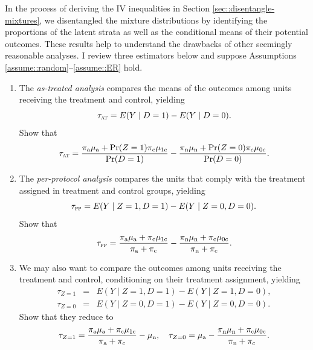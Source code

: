 \begin{HomeworkProblem}\label{exr:22-8}

In the process of deriving the IV inequalities in Section \ref{sec::disentangle-mixtures}, we disentangled the mixture distributions by identifying the proportions of the latent strata as well as the conditional means of their potential outcomes. These results help to understand the drawbacks of other seemingly reasonable analyses. I review three estimators below and suppose Assumptions \ref{assume::random}--\ref{assume::ER} hold.


\begin{enumerate}
\item
The {\it as-treated analysis} compares the means of the outcomes among units receiving the treatment and control, yielding
\[
\tau_\textsc{at} = E(Y\mid D=1) - E(Y\mid D=0).
\]
Show that
\[
\tau_\textsc{at} = \frac{  \pi_{\textup{a}} \mu_{\textup{a}} + \operatorname{Pr}(Z=1)\pi_{\textup{c}} \mu_{1\textup{c}}   }{   \operatorname{Pr}(D=1) }
- \frac{  \pi_{\textup{n}} \mu_{\textup{n}} + \operatorname{Pr}(Z=0) \pi_{\textup{c}} \mu_{0\textup{c}}   }{   \operatorname{Pr}(D=0) } .
\]


\item
The {\it per-protocol analysis} compares the units that comply with the treatment assigned in treatment and control groups, yielding
\[
\tau_\textsc{pp} = E(Y\mid Z=1, D=1) - E(Y\mid Z=0, D=0).
\]
Show that
\[
\tau_\textsc{pp} =\frac{  \pi_{\textup{a}} \mu_{\textup{a}} + \pi_{\textup{c}} \mu_{1\textup{c}} }{  \pi_{\textup{a}}   + \pi_{\textup{c}} }
- \frac{  \pi_{\textup{n}} \mu_{\textup{n}} + \pi_{\textup{c}} \mu_{0\textup{c}} }{  \pi_{\textup{n}}   + \pi_{\textup{c}} }.
\]


\item
We may also want to compare the outcomes among units receiving the treatment and control, conditioning on their treatment assignment, yielding
\begin{eqnarray*}
\tau_{Z=1} &=& E(Y\mid Z=1, D=1) - E(Y\mid Z=1, D=0),\\
\tau_{Z=0} &=& E(Y\mid Z=0, D=1) - E(Y\mid Z=0, D=0).
\end{eqnarray*}
Show that they reduce to
\[
\tau_{Z=1}  = \frac{  \pi_{\textup{a}} \mu_{\textup{a}} + \pi_{\textup{c}} \mu_{1\textup{c}} }{  \pi_{\textup{a}}   + \pi_{\textup{c}} } - \mu_{\textup{n}},\quad
\tau_{Z=0} = \mu_{\textup{a}} - \frac{  \pi_{\textup{n}} \mu_{\textup{n}} + \pi_{\textup{c}} \mu_{0\textup{c}} }{  \pi_{\textup{n}}   + \pi_{\textup{c}} }.
\]
\end{enumerate}


\end{HomeworkProblem}

